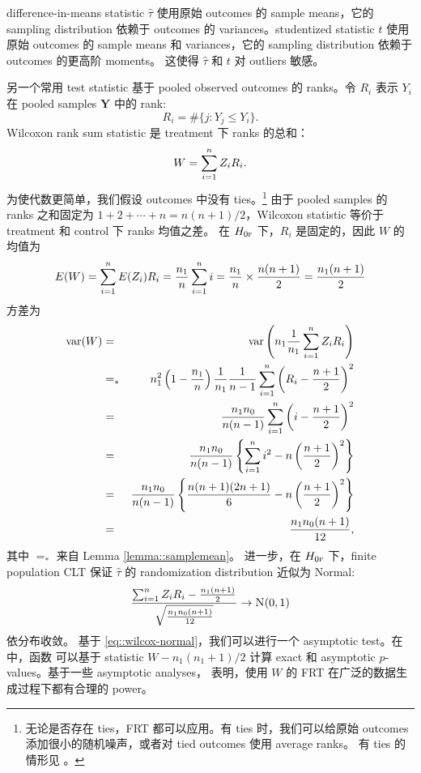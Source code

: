 \begin{example}\label{example::wilcoxon-cre}
difference-in-means statistic $ \hat{\tau} $ 使用原始 outcomes 的 sample means，它的 sampling distribution 依赖于 outcomes 的 variances。studentized statistic $t$ 使用原始 outcomes 的 sample means 和 variances，它的 sampling distribution 依赖于 outcomes 的更高阶 moments。
这使得 $ \hat{\tau} $ 和 $t$ 对 outliers 敏感。

另一个常用 test statistic 基于 pooled observed outcomes 的 ranks。令 $R_i$ 表示 $Y_i$ 在 pooled samples $\boldsymbol{Y}$ 中的 rank:
$$
R_i = \#\{j : Y_j \leq Y_i  \}.
$$ 
Wilcoxon rank sum statistic 是 treatment 下 ranks 的总和：
$$
W = \sum_{i=1}^n Z_i R_i.
$$
为使代数更简单，我们假设 outcomes 中没有 ties。\footnote{
无论是否存在 ties，FRT 都可以应用。有 ties 时，我们可以给原始 outcomes 添加很小的随机噪声，或者对 tied outcomes 使用 average ranks。
有 ties 的情形见 \citet[][Chapter 1 Section 4]{lehmann2006nonparametrics}。
}
由于 pooled samples 的 ranks 之和固定为 $1+2+\cdots + n = n(n+1)/2$，Wilcoxon statistic 等价于 treatment 和 control 下 ranks 均值之差。
在 $H_{0\textsc{f}}$ 下，$R_i$ 是固定的，因此
$W$ 的均值为
$$
E(W)  =  \sum_{i=1}^n E(Z_i) R_i  =\frac{n_1}{n}  \sum_{i=1}^n  i   = \frac{n_1}{n} \times \frac{n(n+1)}{2} = \frac{n_1(n+1)}{2} 
$$
方差为
\begin{eqnarray*}
\textup{var}(W) &=& \textup{var}\left( n_1 \frac{1}{n_1} \sum_{i=1}^n Z_i R_i  \right) \\
&=_*&  n_1^2  \left( 1-\frac{n_1}{n} \right)  \frac{1}{n_1}  \frac{1}{n-1} \sum_{i=1}^n \left(R_i - \frac{n+1}{2}  \right)^2\\
&=&  \frac{n_1 n_0}{n(n-1)} \sum_{i=1}^n \left(i - \frac{n+1}{2}  \right)^2\\
&=&   \frac{n_1 n_0}{n(n-1)}   \left\{ \sum_{i=1}^n i^2 - n \left(  \frac{n+1}{2}\right)^2     \right\}\\
&=&  \frac{n_1 n_0}{n(n-1)}  \left\{     \frac{n(n+1)(2n+1)}{6} -    n \left( \frac{n+1}{2}   \right)^2 \right\}  \\
&=& \frac{n_1 n_0 (n+1)}{12},
\end{eqnarray*}
其中 $=_*$ 来自 Lemma \ref{lemma::samplemean}。
进一步，在 $H_{0\textsc{f}}$ 下，finite population CLT 保证 $\widehat{\tau}$ 的 randomization distribution 近似为 Normal:
\begin{eqnarray}
\label{eq::wilcox-normal}
\frac{  \sumn Z_i R_i - \frac{n_1(n+1)}{2}   }{  \sqrt{  \frac{n_1 n_0 (n+1)}{12}   }}   \rightarrow \N01 
\end{eqnarray}
依分布收敛。
基于 \eqref{eq::wilcox-normal}，我们可以进行一个 asymptotic test。在  中，函数  可以基于 statistic $W - n_1(n_1+1)/2$ 计算 exact 和 asymptotic $p$-values。基于一些 asymptotic analyses，\citet{lehmann2006nonparametrics} 表明，使用 $W$ 的 FRT 在广泛的数据生成过程下都有合理的 power。
\end{example}






